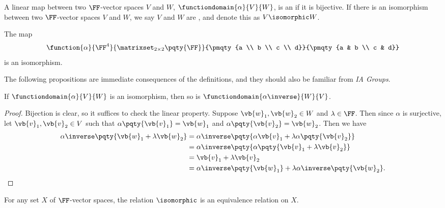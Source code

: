 \begin{definition}[Isomorphism]
    A linear map between two \(\FF\)-vector spaces \(V\) and \(W\), \(\functiondomain{\alpha}{V}{W}\), is an  if it is bijective. If there is an isomorphism between two \(\FF\)-vector spaces \(V\) and \(W\), we say \(V\) and \(W\) are , and denote this as \(V \isomorphic W\).
\end{definition}

\begin{example}[Isomorphisms]
    The map
    \[
        \function{\alpha}{\FF^4}{\matrixset_{2 \times 2} \pqty{\FF}}{\pmqty{a \\ b \\ c \\ d}}{\pmqty{a & b \\ c & d}}
    \]
    is an isomorphism.
\end{example}

The following propositions are immediate consequences of the definitions, and they should also be familiar from \textit{IA Groups}.

\begin{proposition}
    If \(\functiondomain{\alpha}{V}{W}\) is an isomorphism, then so is \(\functiondomain{\alpha\inverse}{W}{V}\).
\end{proposition}

\begin{proof}
    Bijection is clear, so it suffices to check the linear property. Suppose \(\vb{w}_1, \vb{w}_2 \in W\) and \(\lambda \in \FF\). Then since \(\alpha\) is surjective, let \(\vb{v}_1, \vb{v}_2 \in V\) such that \(\alpha\pqty{\vb{v}_1} = \vb{w}_1\) and \(\alpha\pqty{\vb{v}_2} = \vb{w}_2\). Then we have
    \begin{align*}
        \alpha\inverse \pqty{\vb{w}_1 + \lambda \vb{w}_2} &= \alpha\inverse \pqty{\alpha{\vb{v}_1} + \lambda \alpha\pqty{\vb{v}_2}} \\
        &= \alpha\inverse \pqty{\alpha\pqty{\vb{v}_1 + \lambda \vb{v}_2}} \\
        &= \vb{v}_1 + \lambda \vb{v}_2 \\
        &= \alpha\inverse\pqty{\vb{w}_1} + \lambda \alpha\inverse\pqty{\vb{w}_2}.
    \end{align*}
\end{proof}

\begin{remark}
    For any set \(X\) of \(\FF\)-vector spaces, the relation \(\isomorphic\) is an equivalence relation on \(X\).
\end{remark}

